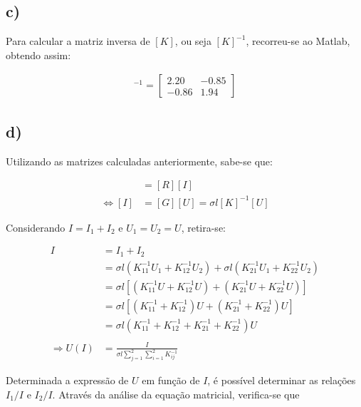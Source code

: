 \documentclass[11pt, a4paper, titlepage, portuguese]{article}
\newcommand{\eq}{\Leftrightarrow} %
\begin{document}
	\subsection{c)}

		\par
		Para calcular a matriz inversa de $[K]$, ou seja $[K]^{-1}$, recorreu-se ao Matlab, obtendo assim:

		\begin{align*}
			[K]^{-1} =
			\begin{bmatrix}
				2.20 & -0.85 \\
  		 -0.86 &  1.94
			\end{bmatrix}
		\end{align*}

	\subsection{d)}

		\par
		Utilizando as matrizes calculadas anteriormente, sabe-se que:

		\begin{align*}
				[U] &= [R][I] \\
			\eq [I] &= [G][U] = \sigma l [K]^{-1}[U]
		\end{align*}

		\par
		Considerando $I = I_1 + I_2$ e $U_1 = U_2 = U$, retira-se:

		\begin{align*}
			I &= I_1 + I_2 \\
			&= \sigma l \left(K^{-1}_{11}U_1 + K^{-1}_{12}U_2\right) + \sigma l \left(K^{-1}_{21}U_1 + K^{-1}_{22}U_2\right)  \\
			&= \sigma l \left[ \left(K^{-1}_{11}U + K^{-1}_{12}U\right) + \left(K^{-1}_{21}U + K^{-1}_{22}U\right) \right] \\
			&= \sigma l \left[ \left(K^{-1}_{11} + K^{-1}_{12}\right)U + \left(K^{-1}_{21} + K^{-1}_{22}\right)U \right] \\
			&= \sigma l \left( K^{-1}_{11} + K^{-1}_{12} + K^{-1}_{21} + K^{-1}_{22} \right) U\\ \\
			\Rightarrow U(I) &= \frac{I}{\sigma l \sum\limits_{j=1}^{2} \sum\limits_{i=1}^{2} K^{-1}_{ij}}
		\end{align*}

		\par
		Determinada a expressão de $U$ em função de $I$, é possível determinar as relações $I_1/I$ e $I_2/I$. Através da análise da equação matricial, verifica-se que
\end{document}
